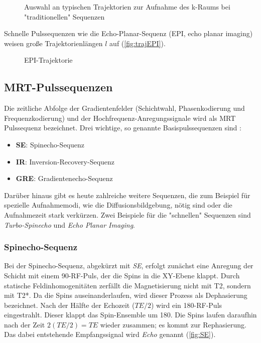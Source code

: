 \begin{figure}[H]
	\centering
	\hfill
	\hfill
	\caption[k-Raum Trajektorien]{Auswahl an typischen Trajektorien zur Aufnahme des k-Raums bei "traditionellen" Sequenzen}
	\label{fig:trajClassic}
\end{figure}

Schnelle Pulssequenzen wie die Echo-Planar-Sequenz (EPI, echo planar imaging) weisen große Trajektorienlängen $l$ auf (\autoref{fig:trajEPI}).

\begin{figure}[H]
	\centering
	\caption[Echoplanar Sequenz]{EPI-Trajektorie}
	\label{fig:trajEPI}
\end{figure} 

\subsection{MRT-Pulssequenzen}
Die zeitliche Abfolge der Gradientenfelder (Schichtwahl, Phasenkodierung und Frequenzkodierung) und der Hochfrequenz-Anregungssignale wird als MRT Pulssequenz bezeichnet.
Drei wichtige, so genannte Basispulssequenzen sind \cite[S. 999]{Weishaupt2014}:
\begin{itemize}
	\item \textbf{SE}: Spinecho-Sequenz
	\item \textbf{IR}: Inversion-Recovery-Sequenz
	\item \textbf{GRE}: Gradientenecho-Sequenz
\end{itemize}

Darüber hinaus gibt es heute zahlreiche weitere Sequenzen, die zum Beispiel für spezielle Aufnahmemodi, wie die Diffusionsbildgebung, nötig sind oder die Aufnahmezeit stark verkürzen. Zwei Beispiele für die "schnellen" Sequenzen sind \textit{Turbo-Spinecho} und \textit{Echo Planar Imaging}.


\subsubsection{Spinecho-Sequenz}
\label{sec:SE}
Bei der Spinecho-Sequenz, abgekürzt mit \textit{SE}, erfolgt zunächst eine Anregung der Schicht mit einem 90\degree-RF-Puls, der die Spins in die XY-Ebene klappt. Durch statische Feldinhomogenitäten zerfällt die Magnetisierung nicht mit T2, sondern mit T2*. Da die Spins auseinanderlaufen, wird dieser Prozess als Dephasierung bezeichnet. Nach der Hälfte der Echozeit ($TE/2$) wird ein 180\degree-RF-Puls eingestrahlt. Dieser klappt das Spin-Ensemble um 180\degree. Die Spins laufen daraufhin nach der Zeit $2(TE/2) = TE$ wieder zusammen; es kommt zur Rephasierung. Das dabei entstehende Empfangssignal wird \textit{Echo} genannt (\autoref{fig:SE}).

